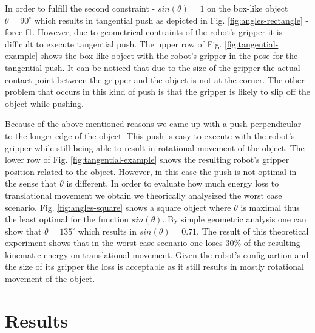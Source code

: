 In order to fulfill the second constraint - $sin(\theta) = 1$ on the box-like object $\theta = 90 ^\circ$ which results in tangential push as depicted in Fig. \ref{fig:angles-rectangle} - force f1. However, due to geometrical contraints of the robot's gripper it is difficult to execute tangential push. The upper row of Fig. \ref{fig:tangential-example} shows the box-like object with the robot's gripper in the pose for the tangential push. It can be noticed that due to the size of the gripper the actual contact point between the gripper and the object is not at the corner. The other problem that occurs in this kind of push is that the gripper is likely to slip off the object while pushing.

Because of the above mentioned reasons we came up with a push perpendicular to the longer edge of the object. This push is easy to execute with the robot's gripper while still being able to result in rotational movement of the object. The lower row of Fig. \ref{fig:tangential-example} shows the resulting robot's gripper position related to the object. However, in this case the push is not optimal in the sense that $\theta$ is different. In order to evaluate how much energy loss to translational movement we obtain we theorically analysized the worst case scenario. Fig. \ref{fig:angles-square} shows a square object where $\theta$ is maximal thus the least optimal for the function $sin(\theta)$. By simple geometric analysis one can show that $\theta =135 ^\circ$ which results in $sin(\theta) = 0.71$. The result of this theoretical experiment shows that in the worst case scenario one loses 30\% of the resulting kinematic energy on translational movement. Given the robot's configuartion and the size of its gripper the loss is acceptable as it still results in mostly rotational movement of the object. 







\section{Results}

